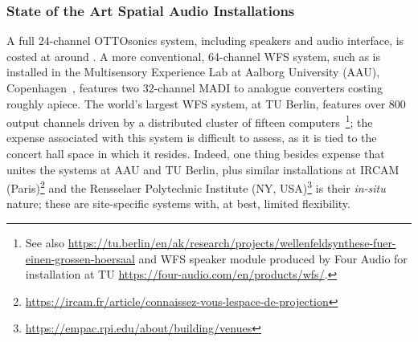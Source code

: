 \subsubsection{State of the Art Spatial Audio Installations}
\label{subsubsec:spatial-sota}

A full 24-channel OTTOsonics system, including speakers and audio interface, is
costed at around .
A more conventional, 64-channel WFS system, such as is installed in the
Multisensory Experience Lab at Aalborg University (AAU),
Copenhagen~\citep{grani_gestural_2016}, features two 32-channel MADI to analogue
converters costing roughly  apiece.
The world's largest WFS system, at TU Berlin, features over 800 output channels
driven by a distributed cluster of fifteen
computers~\citep{baalman_renewed_2007}\footnote{
    See also
    \url{https://tu.berlin/en/ak/research/projects/wellenfeldsynthese-fuer-einen-grossen-hoersaal}
    and WFS speaker module produced by Four Audio for installation at TU
    \url{https://four-audio.com/en/products/wfs/}.
}; the expense associated with this system is difficult to assess, as it is tied
to the concert hall space in which it resides.
Indeed, one thing besides expense that unites the systems at AAU and TU Berlin,
plus similar installations at IRCAM (Paris)\footnote{
    \url{https://ircam.fr/article/connaissez-vous-lespace-de-projection}
} and the Rensselaer Polytechnic Institute (NY, USA)\footnote{
    \url{https://empac.rpi.edu/about/building/venues}
} is their \textit{in-situ} nature;
these are site-specific systems with, at best, limited flexibility.
